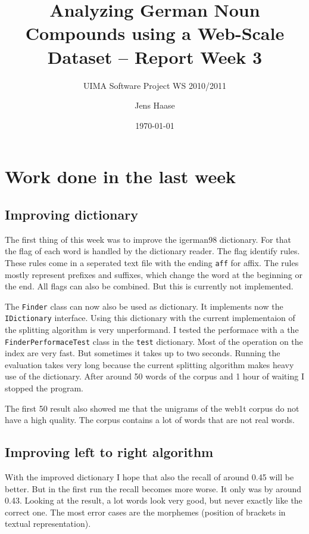 \documentclass[11pt, accentcolor=tud9b, nochapname]{tudexercise}
\begin{document}
\author{Jens Haase}
\title{Analyzing German Noun Compounds using a
  Web-Scale Dataset -- Report Week 3}
\subtitle{UIMA Software Project WS 2010/2011}
\date{\today}
\maketitle

\section{Work done in the last week}

\subsection{Improving dictionary}
The first thing of this week was to improve the igerman98
dictionary. For that the flag of each word is handled by the dictionary
reader. The flag identify rules. These rules come in a seperated text
file with the ending \texttt{aff} for affix. The rules mostly represent prefixes and suffixes, which change the word at the beginning or the end. All flags can
also be combined. But this is currently not implemented.

The \texttt{Finder} class can now also be used as dictionary. It implements
now the \texttt{IDictionary} interface. Using this
dictionary with the current implementaion of the splitting algorithm
is very unperformand. I tested the performace with a the
\texttt{FinderPerformaceTest} class in the \texttt{test}
dictionary. Most of the operation on the index are very fast. But
sometimes it takes up to two seconds. Running the evaluation takes
very long because the current splitting algorithm makes heavy use of
the dictionary. After around 50 words of the corpus and 1 hour of waiting
I stopped the program.

The first 50 result also showed me that the unigrams of the web1t
corpus do not have a high quality. The corpus contains a lot of words
that are not real words.

\subsection{Improving left to right algorithm}

With the improved dictionary I hope that also the recall of around
0.45 will be better. But in the first run the recall becomes more
worse. It only was by around 0.43. Looking at the result, a lot words look very good, but never exactly like the correct one. The most
error cases are the morphemes (position of brackets in textual representation).
\end{document}
